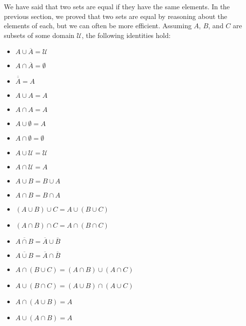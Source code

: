 \documentclass[letterpaper,10pt,english]{sphinxmanual}
\begin{document}
\sphinxAtStartPar
We have said that two sets are equal if they have the same elements. In the previous section, we proved that two sets are equal by reasoning about the elements of each, but we can often be more efficient. Assuming \(A\), \(B\), and \(C\) are subsets of some domain \(\mathcal U\), the following identities hold:
\begin{itemize}
\item {} 
\sphinxAtStartPar
\(A \cup \overline A = \mathcal U\)

\item {} 
\sphinxAtStartPar
\(A \cap \overline A = \emptyset\)

\item {} 
\sphinxAtStartPar
\(\overline {\overline A} = A\)

\item {} 
\sphinxAtStartPar
\(A \cup A = A\)

\item {} 
\sphinxAtStartPar
\(A \cap A = A\)

\item {} 
\sphinxAtStartPar
\(A \cup \emptyset = A\)

\item {} 
\sphinxAtStartPar
\(A \cap \emptyset = \emptyset\)

\item {} 
\sphinxAtStartPar
\(A \cup \mathcal U = \mathcal U\)

\item {} 
\sphinxAtStartPar
\(A \cap \mathcal U = A\)

\item {} 
\sphinxAtStartPar
\(A \cup B = B \cup A\)

\item {} 
\sphinxAtStartPar
\(A \cap B = B \cap A\)

\item {} 
\sphinxAtStartPar
\((A \cup B) \cup C = A \cup (B \cup C)\)

\item {} 
\sphinxAtStartPar
\((A \cap B) \cap C = A \cap (B \cap C)\)

\item {} 
\sphinxAtStartPar
\(\overline{A \cap B} = \overline A \cup \overline B\)

\item {} 
\sphinxAtStartPar
\(\overline{A \cup B} = \overline A \cap \overline B\)

\item {} 
\sphinxAtStartPar
\(A \cap (B \cup C) = (A \cap B) \cup (A \cap C)\)

\item {} 
\sphinxAtStartPar
\(A \cup (B \cap C) = (A \cup B) \cap (A \cup C)\)

\item {} 
\sphinxAtStartPar
\(A \cap (A \cup B) = A\)

\item {} 
\sphinxAtStartPar
\(A \cup (A \cap B) = A\)

\end{itemize}
\end{document}

